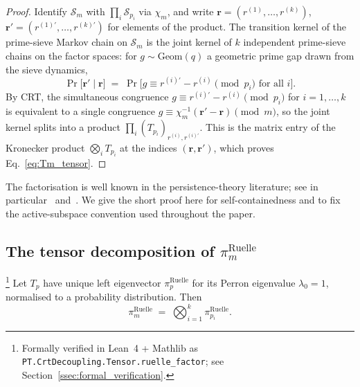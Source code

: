 \begin{proof}
Identify $\mathcal{S}_m$ with $\prod_i \mathcal{S}_{p_i}$ via
$\chi_m$, and write $\mathbf{r} = (r^{(1)}, \ldots, r^{(k)})$,
$\mathbf{r}' = (r^{(1)\prime}, \ldots, r^{(k)\prime})$ for
elements of the product. The transition kernel of the prime-sieve
Markov chain on $\mathcal{S}_m$ is the joint kernel of $k$
independent prime-sieve chains on the factor spaces: for
$g \sim \mathrm{Geom}(q)$ a geometric prime gap drawn from the
sieve dynamics,
\begin{equation}
  \Pr\!\bigl[\mathbf{r}' \mid \mathbf{r}\bigr]
  \;=\;
  \Pr\!\bigl[g \equiv r^{(i)\prime} - r^{(i)} \pmod{p_i}
        \text{ for all } i\bigr].
\end{equation}
By CRT, the simultaneous congruence
$g \equiv r^{(i)\prime} - r^{(i)} \pmod{p_i}$ for $i = 1, \ldots, k$
is equivalent to a single congruence
$g \equiv \chi_m^{-1}(\mathbf{r}' - \mathbf{r}) \pmod{m}$, so the
joint kernel splits into a product
$\prod_i (T_{p_i})_{r^{(i)}, r^{(i)\prime}}$. This is the matrix
entry of the Kronecker product $\bigotimes_i T_{p_i}$ at the
indices $(\mathbf{r}, \mathbf{r}')$, which proves
Eq.~\eqref{eq:Tm_tensor}.
\end{proof}

The factorisation is well known in the persistence-theory
literature; see in particular~\cite[eq.~CRT\_factor]{PT_GRAVITON}
and~\cite[Lemma~G, step~G.2]{PT_Monograph}. We give the short proof
here for self-containedness and to fix the active-subspace
convention used throughout the paper.

\subsection{The tensor decomposition of $\pi_m^{\mathrm{Ruelle}}$}
\label{ssec:pi_decomposition}

\begin{lemma}
\label{lem:pi_factor}
\footnote{Formally verified in Lean~4 + Mathlib as
\texttt{PT.CrtDecoupling.Tensor.ruelle\_factor};
see Section~\ref{ssec:formal_verification}.}
Let $T_p$ have unique left eigenvector $\pi_p^{\mathrm{Ruelle}}$
for its Perron eigenvalue $\lambda_0 = 1$, normalised to a
probability distribution. Then
\begin{equation}
  \pi_{m}^{\mathrm{Ruelle}}
  \;=\;
  \bigotimes_{i=1}^{k} \pi_{p_i}^{\mathrm{Ruelle}}.
  \label{eq:pi_factor}
\end{equation}
\end{lemma}

